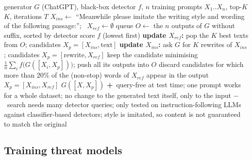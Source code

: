 \documentclass[10pt,a4paper,twocolumn]{article}
\newcommand{\pro}[1]{\Statex\textcolor{proc}{\textbf{+}\ #1}}
\newcommand{\con}[1]{\Statex\textcolor{conc}{\textbf{$-$}\ #1}}
\begin{document}
\begin{algorithm}[H]\small
\caption{Instructional-prompt attack (Shi et al.\ 2023, red teaming)}
\begin{algorithmic}[1]
\Require generator $G$ (ChatGPT), black-box detector $f$, $n$ training prompts $X_1..X_n$, top-$K$ $K$, iterations $T$
 \State $X_{ins}\gets$ ``Meanwhile please imitate the writing style and wording of the following passage:''; \ $X_{ref}\gets\emptyset$
 \State queue $O\gets$ the $n$ outputs of $G$ without suffix, sorted by detector score $f$ (lowest first)
  \State \textbf{update $X_{ref}$:} pop the $K$ best texts from $O$; candidates $X_p=[X_{ins},\text{text}]$
  \State \textbf{update $X_{ins}$:} ask $G$ for $K$ rewrites of $X_{ins}$; candidates $X_p=[\text{rewrite},X_{ref}]$
  \State keep the candidate minimising $\frac1n\sum_if\big(G([X_i,X_p])\big)$; push all its outputs into $O$
  \State discard candidates for which more than 20\% of the (non-stop) words of $X_{ref}$ appear in the output 
 \EndFor
 \State \Return $X_p=[X_{ins},X_{ref}]$
\EndProcedure
{} \State \Return $G([X,X_p])$  \EndProcedure
\pro{query-free at test time; one prompt works for a whole dataset; no change to the generated text itself, only to the input}
\con{search needs many detector queries; only tested on instruction-following LLMs against classifier-based detectors; style is imitated, so content is not guaranteed to match the original}
\end{algorithmic}
\end{algorithm}

\subsection*{Training threat models}
\end{document}
